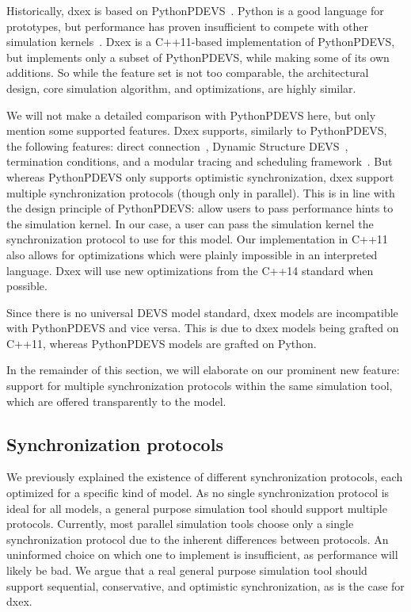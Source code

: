 \newcommand{\plotfraction}{0.85}
Historically, dxex is based on PythonPDEVS~\cite{PythonPDEVS}.
Python is a good language for prototypes, but performance has proven insufficient to compete with other simulation kernels~\cite{MasterThesis}.
Dxex is a C++11-based implementation of PythonPDEVS, but implements only a subset of PythonPDEVS, while making some of its own additions.
So while the feature set is not too comparable, the architectural design, core simulation algorithm, and optimizations, are highly similar.

We will not make a detailed comparison with PythonPDEVS here, but only mention some supported features.
Dxex supports, similarly to PythonPDEVS, the following features: direct connection~\cite{SymbolicFlattening}, \textsf{Dynamic Structure DEVS}~\cite{DSDEVS}, termination conditions, and a modular tracing and scheduling framework~\cite{PythonPDEVS}.
But whereas PythonPDEVS only supports optimistic synchronization, dxex support multiple synchronization protocols (though only in parallel).
This is in line with the design principle of PythonPDEVS: allow users to pass performance hints to the simulation kernel.
In our case, a user can pass the simulation kernel the synchronization protocol to use for this model.
Our implementation in C++11 also allows for optimizations which were plainly impossible in an interpreted language. Dxex will use new optimizations from the C++14 standard when possible.

Since there is no universal \textsf{DEVS} model standard, dxex models are incompatible with PythonPDEVS and vice versa.
This is due to dxex models being grafted on C++11, whereas PythonPDEVS models are grafted on Python.

In the remainder of this section, we will elaborate on our prominent new feature: support for multiple synchronization protocols within the same simulation tool, which are offered transparently to the model.

\subsection{Synchronization protocols}
We previously explained the existence of different synchronization protocols, each optimized for a specific kind of model.
As no single synchronization protocol is ideal for all models, a general purpose simulation tool should support multiple protocols.
Currently, most parallel simulation tools choose only a single synchronization protocol due to the inherent differences between protocols.
An uninformed choice on which one to implement is insufficient, as performance will likely be bad.
We argue that a real general purpose simulation tool should support sequential, conservative, and optimistic synchronization, as is the case for dxex.

